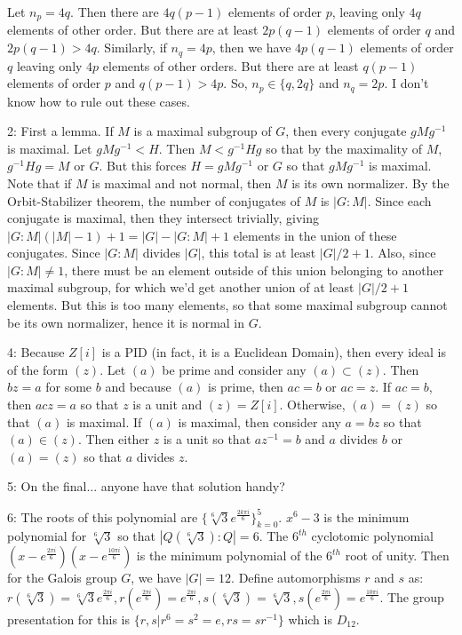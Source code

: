 \documentclass[12pt]{article}
\begin{document}
Let $n_p=4q$. Then there are $4q(p-1)$ elements of order $p$, leaving only $4q$ elements of other order. But there are at least $2p(q-1)$ elements of order $q$ and $2p(q-1)>4q$. Similarly, if $n_q=4p$, then we have $4p(q-1)$ elements of order $q$ leaving only $4p$ elements of other orders. But there are at least $q(p-1)$ elements of order $p$ and $q(p-1)>4p$. So, $n_p \in \{q,2q\}$ and $n_q=2p$. I don't know how to rule out these cases. \newline

2: First a lemma. If $M$ is a maximal subgroup of $G$, then every conjugate $gMg^{-1}$ is maximal. Let $gMg^{-1} < H$. Then $M < g^{-1}Hg$ so that by the maximality of $M$, $g^{-1}Hg=M$ or $G$. But this forces $H=gMg^{-1}$ or $G$ so that $gMg^{-1}$ is maximal. Note that if $M$ is maximal and not normal, then $M$ is its own normalizer. By the Orbit-Stabilizer theorem, the number of conjugates of $M$ is $|G:M|$. Since each conjugate is maximal, then they intersect trivially, giving $|G:M|(|M|-1)+1=|G|-|G:M|+1$ elements in the union of these conjugates. Since $|G:M|$ divides $|G|$, this total is at least $|G|/2+1$. Also, since $|G:M| \neq 1$, there must be an element outside of this union belonging to another maximal subgroup, for which we'd get another union of at least $|G|/2+1$ elements. But this is too many elements, so that some maximal subgroup cannot be its own normalizer, hence it is normal in $G$. \newline

4: Because $Z[i]$ is a PID (in fact, it is a Euclidean Domain), then every ideal is of the form $(z)$. Let $(a)$ be prime and consider any $(a) \subset (z)$. Then $bz=a$ for some $b$ and because $(a)$ is prime, then $ac=b$ or $ac=z$. If $ac=b$, then $acz=a$ so that $z$ is a unit and $(z)=Z[i]$. Otherwise, $(a)=(z)$ so that $(a)$ is maximal. If $(a)$ is maximal, then consider any $a=bz$ so that $(a) \in (z)$. Then either $z$ is a unit so that $az^{-1}=b$ and $a$ divides $b$ or $(a)=(z)$ so that $a$ divides $z$. \newline

{\color{red} 5: On the final... anyone have that solution handy?} \newline

6: The roots of this polynomial are $\{\sqrt[6]{3}e^{\frac{2k \pi i}{6}}\}_{k=0}^5$. $x^6-3$ is the minimum polynomial for $\sqrt[6]{3}$ so that $|Q(\sqrt[6]{3}):Q|=6$. The $6^{th}$ cyclotomic polynomial $(x-e^{\frac{2 \pi i}{6}})(x-e^{\frac{10 \pi i}{6}})$ is the minimum polynomial of the $6^{th}$ root of unity. Then for the Galois group $G$, we have $|G|=12$. Define automorphisms $r$ and $s$ as: $r(\sqrt[6]{3})=\sqrt[6]{3}e^{\frac{2 \pi i}{6}},r(e^{\frac{2 \pi i}{6}})=e^{\frac{2 \pi i}{6}}, s(\sqrt[6]{3})=\sqrt[6]{3},s(e^{\frac{2 \pi i}{6}})=e^{\frac{10 \pi i}{6}}$. The group presentation for this is $\{r,s|r^6=s^2=e,rs=sr^{-1}\}$ which is $D_{12}$.
\end{document}
